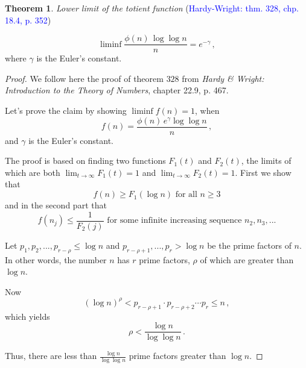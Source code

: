 \documentclass{article}
\theoremstyle{definition}
\newtheorem{theorem}[subsection]{Theorem}
\begin{document}
\begin{theorem}{\emph{Lower limit of the totient function} (\textcolor{blue}{Hardy-Wright: thm. 328, chp. 18.4, p. 352})}

\begin{equation*}
    \liminf{\frac{\phi(n)\,\log\log n}{n}}=e^{-\gamma}\,,
\end{equation*}
where $\gamma$ is the Euler's constant.

\begin{proof}

We follow here the proof of theorem $328$ from \textit{Hardy \& Wright: Introduction to the Theory of Numbers}, chapter 22.9, p. 467.

Let's prove the claim by showing $\liminf{f(n)} = 1$, when
\begin{equation*}
    f(n)= \frac{\phi(n)\,e^\gamma \log\log n}{n}\,,
\end{equation*}
and $\gamma$ is the Euler's constant.

The proof is based on finding two functions $F_1(t)$ and $F_2(t)$, the limits of which are both $\lim_{t\rightarrow \infty} F_1(t) = 1$ and $\lim_{t\rightarrow \infty} F_2(t) = 1$. First we show that 
\begin{equation}
\label{eq:first}
    f(n) \geq F_1(\log n)\text{ for all }n\geq 3
\end{equation}
and in the second part that
\begin{equation}
\label{eq:second}
    f(n_j) \leq \frac{1}{F_2(j)}\text{ for some infinite increasing sequence }n_2, n_3,...
\end{equation}

Let $p_1,p_2,...,p_{r-\rho} \leq \log n$ and $p_{r-\rho+1},...,p_r > \log n$ be the prime factors of $n$. In other words, the number $n$ has $r$ prime factors, $\rho$ of which are greater than $\log n$.

Now
\begin{equation*}
    (\log n)^\rho < p_{r-\rho+1} \cdot p_{r-\rho+2} \cdots p_r \leq n\,,
\end{equation*}
which yields
\begin{equation*}
    \rho < \frac{\log n}{\log\log n}\,.
\end{equation*}

Thus, there are less than $\frac{\log n}{\log\log n}$ prime factors greater than $\log n$.


\end{proof}
\end{theorem}
\end{document}
